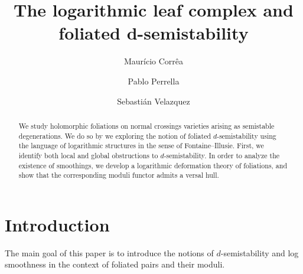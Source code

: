 \documentclass[reqno]{amsart}
\theoremstyle{definition}
\theoremstyle{named}
\begin{document}
\title{The logarithmic leaf complex and foliated d-semistability}


\author[M. Corr\^ea]{ Maur\'icio Corr\^ea }
\address[M. Corr\^ea]{Dipartimento di Matematica, Universit\`a degli Studi di Bari,  Via E. Orabona 4, I-70125, Bari, Italy
}




\author[ P. Perrella]{  Pablo Perrella }
\address[P. Perrella]{Departamento de Matem\'atica, Facultad de Ciencias Exactas y Naturales, Universidad de Buenos Aires and IMAS (UBA-CONICET), Buenos Aires, Argentina.
}



\author[ S. Velazquez]{ Sebasti\'an Velazquez }
\address[S. Velazquez]{Department of Mathematics, King’s College London, Strand, London WC2R 2LS, United Kingdom}








\begin{abstract} 
We study holomorphic foliations on normal crossings varieties arising as semistable degenerations. We do so by we exploring the notion of foliated $d$-semistability using the language of  logarithmic structures in the sense of Fontaine–Illusie. First, we  identify both local and global obstructions to $d$-semistability. In order to analyze the existence of smoothings, we develop a logarithmic deformation theory of foliations, and show that the corresponding moduli functor admits a versal hull.
\end{abstract}

\maketitle


\section{Introduction}


The main goal of this paper is to introduce the notions of $d$-semistability and log smoothness in the context of foliated pairs and their moduli.
\end{document}
